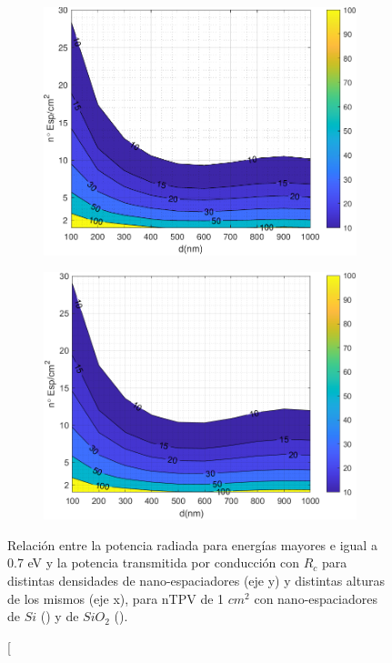 \begin{figure} [h]%
	\centering
	\begin{subfigure}[b]{0.48\textwidth}%
			\includegraphics[width=\columnwidth]{rel_SiC}%
			\caption{}%
			\label{fig:prc_SiCSi}%
	\end{subfigure}
	\hfill
	\begin{subfigure}[b]{0.48\textwidth}%
			\includegraphics[width=\columnwidth]{SiC_Rc}%
			\caption{}%
			\label{fig:prc_SiCSiO2}%
	\end{subfigure}
	\caption[Relación entre la potencia radiada para energías mayores e igual a 0.7 eV y la potencia transmitida por conducción con $R_c$ para distintas densidades de nano-espaciadores (eje y) y distintas alturas de los mismos (eje x), para nTPV de 1 $cm^2$ con nano-espaciadores de $Si$ () y de $SiO_2$ (). 

\end{figure}
